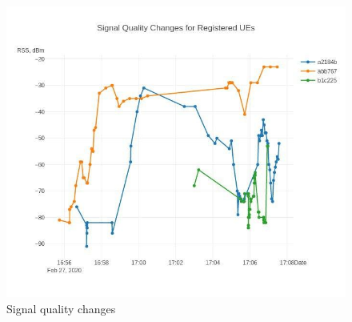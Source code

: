 \begin{figure}[H]
	\centering
	\includegraphics[width=\linewidth,keepaspectratio]{images/experiment_3_3.jpg}
\caption{Signal quality changes}
\end{figure}
